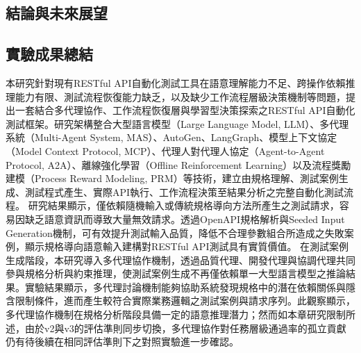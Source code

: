 \begin{ZhChapter}
\chapter{結論與未來展望}

\section{實驗成果總結}
\text 本研究針對現有RESTful API自動化測試工具在語意理解能力不足、跨操作依賴推理能力有限、測試流程恢復能力缺乏，以及缺少工作流程層級決策機制等問題，提出一套結合多代理協作、工作流程恢復層與學習型決策探索之RESTful API自動化測試框架。研究架構整合大型語言模型（Large Language Model, LLM）、多代理系統（Multi-Agent System, MAS）、AutoGen、LangGraph、模型上下文協定（Model Context Protocol, MCP）、代理人對代理人協定（Agent-to-Agent Protocol, A2A）、離線強化學習（Offline Reinforcement Learning）以及流程獎勵建模（Process Reward Modeling, PRM）等技術，建立由規格理解、測試案例生成、測試程式產生、實際API執行、工作流程決策至結果分析之完整自動化測試流程。
\text 研究結果顯示，僅依賴隨機輸入或傳統規格導向方法所產生之測試請求，容易因缺乏語意資訊而導致大量無效請求。透過OpenAPI規格解析與Seeded Input Generation機制，可有效提升測試輸入品質，降低不合理參數組合所造成之失敗案例，顯示規格導向語意輸入建構對RESTful API測試具有實質價值。
\text 在測試案例生成階段，本研究導入多代理協作機制，透過品質代理、開發代理與協調代理共同參與規格分析與約束推理，使測試案例生成不再僅依賴單一大型語言模型之推論結果。實驗結果顯示，多代理討論機制能夠協助系統發現規格中的潛在依賴關係與隱含限制條件，進而產生較符合實際業務邏輯之測試案例與請求序列。此觀察顯示，多代理協作機制在規格分析階段具備一定的語意推理潛力；然而如本章研究限制所述，由於v2與v3的評估準則同步切換，多代理協作對任務層級通過率的孤立貢獻仍有待後續在相同評估準則下之對照實驗進一步確認。


\end{ZhChapter}
